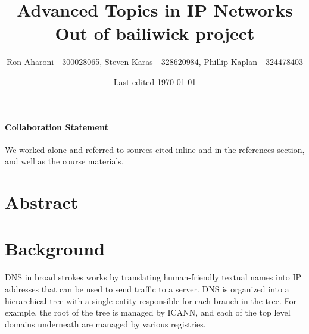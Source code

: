 \documentclass{idc_msc}
\title{Advanced Topics in IP Networks \\\large Out of bailiwick project}
\date{Last edited \today}
\author{Ron Aharoni\texorpdfstring{ - 300028065}{}, Steven Karas\texorpdfstring{ - 328620984}{}, Phillip Kaplan\texorpdfstring{ - 324478403}{}}
\begin{document}
\paragraph{Collaboration Statement}
  We worked alone and referred to sources cited inline and in the references section, and well as the course materials.


\section{Abstract}

\section{Background}


DNS in broad strokes works by translating human-friendly textual names into IP addresses that can be used to send traffic to a server.
DNS is organized into a hierarchical tree with a single entity responsible for each branch in the tree.
For example, the root of the tree is managed by ICANN, and each of the top level domains underneath are managed by various registries.
\end{document}
